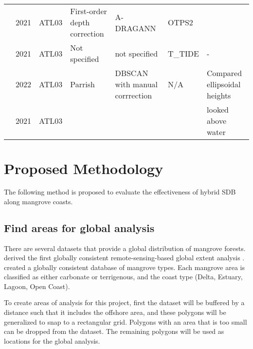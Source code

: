 \begin{landscape}
\begin{table}
\begin{tabular}{lllp{3cm}p{3cm}ll}
                  \citeauthor{Cao2021}                            & 2021 & ATL03   & First-order depth correction  & A-DRAGANN                      & OTPS2           &                              \\
                  \citeauthor{Lee2021}                           & 2021 & ATL03   & Not specified                 & not specified                  & T\_TIDE         & -                            \\
                  \citeauthor{LeQuilleuc2022b}            & 2022 & ATL03   & Parrish                       & DBSCAN with manual corrrection & N/A             & Compared ellipsoidal heights \\
                  \citeauthor{Xu2022a}                            & 2021 & ATL03   &                               &                                &                 & looked above water           \\
                  \bottomrule
            \end{tabular}
      \end{table}
\end{landscape}

\chapter{Proposed Methodology}
The following method is proposed to evaluate the effectiveness of hybrid SDB along mangrove coasts.

\section{Find areas for global analysis}
There are several datasets that provide a global distribution of mangrove forests. \citeauthor{Giri2011b} derived the first globally consistent remote-sensing-based global extent analysis \parencite{Worthington2020}. \citeauthor{add} created a globally consistent database of mangrove types. Each mangrove area is classified as either carbonate or terrigenous, and the coast type (Delta, Estuary, Lagoon, Open Coast).

To create areas of analysis for this project, first the \citeauthor{Giri2011b} dataset will be buffered by a distance such that it includes the offshore area, and these polygons will be generalized to snap to a rectangular grid. Polygons with an area that is too small can be dropped from the dataset. The remaining polygons will be used as locations for the global analysis.

